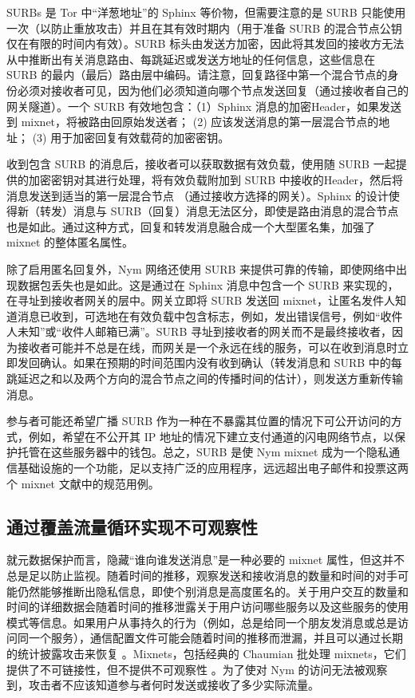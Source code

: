 \documentclass{article}
\begin{document}
	SURBs 是 Tor 中“洋葱地址”的 Sphinx 等价物，但需要注意的是 SURB 只能使用一次（以防止重放攻击）并且在其有效时期内（用于准备 SURB 的混合节点公钥仅在有限的时间内有效）。SURB 标头由发送方加密，因此将其发回的接收方无法从中推断出有关消息路由、每跳延迟或发送方地址的任何信息，这些信息在 SURB 的最内（最后）路由层中编码。请注意，回复路径中第一个混合节点的身份必须对接收者可见，因为他们必须知道向哪个节点发送回复（通过接收者自己的网关隧道）。一个 SURB 有效地包含：（1）Sphinx 消息的加密Header，如果发送到 mixnet，将被路由回原始发送者； (2) 应该发送消息的第一层混合节点的地址； (3) 用于加密回复有效载荷的加密密钥。\newline

	收到包含 SURB 的消息后，接收者可以获取数据有效负载，使用随 SURB 一起提供的加密密钥对其进行处理，将有效负载附加到 SURB 中接收的Header，然后将消息发送到适当的第一层混合节点 （通过接收方选择的网关）。Sphinx 的设计使得新（转发）消息与 SURB（回复）消息无法区分，即使是路由消息的混合节点也是如此。通过这种方式，回复和转发消息融合成一个大型匿名集，加强了 mixnet 的整体匿名属性。\newline

	除了启用匿名回复外，Nym 网络还使用 SURB 来提供可靠的传输，即使网络中出现数据包丢失也是如此。这是通过在 Sphinx 消息中包含一个 SURB 来实现的，在寻址到接收者网关的层中。网关立即将 SURB 发送回 mixnet，让匿名发件人知道消息已收到，可选地在有效负载中包含标志，例如，发出错误信号，例如“收件人未知”或“收件人邮箱已满”。SURB 寻址到接收者的网关而不是最终接收者，因为接收者可能并不总是在线，而网关是一个永远在线的服务，可以在收到消息时立即发回确认。如果在预期的时间范围内没有收到确认（转发消息和 SURB 中的每跳延迟之和以及两个方向的混合节点之间的传播时间的估计），则发送方重新传输消息。\newline

	参与者可能还希望广播 SURB 作为一种在不暴露其位置的情况下可公开访问的方式，例如，希望在不公开其 IP 地址的情况下建立支付通道的闪电网络节点，以保护托管在这些服务器中的钱包。总之，SURB 是使 Nym mixnet 成为一个隐私通信基础设施的一个功能，足以支持广泛的应用程序，远远超出电子邮件和投票这两个 mixnet 文献中的规范用例。\newline

	\subsection{通过覆盖流量循环实现不可观察性}

	就元数据保护而言，隐藏“谁向谁发送消息”是一种必要的 mixnet 属性，但这并不总是足以防止监视。随着时间的推移，观察发送和接收消息的数量和时间的对手可能仍然能够推断出隐私信息，即使个别消息是高度匿名的\cite{ref32}。关于用户交互的数量和时间的详细数据会随着时间的推移泄露关于用户访问哪些服务以及这些服务的使用模式等信息。如果用户从事持久的行为（例如，总是给同一个朋友发消息或总是访问同一个服务），通信配置文件可能会随着时间的推移而泄漏，并且可以通过长期的统计披露攻击来恢复 \cite{ref26, ref31}。Mixnets，包括经典的 Chaumian 批处理 mixnets，它们提供了不可链接性，但不提供不可观察性 \cite{ref87}。为了使对 Nym 的访问无法被观察到，攻击者不应该知道参与者何时发送或接收了多少实际流量。\newline
\end{document}
